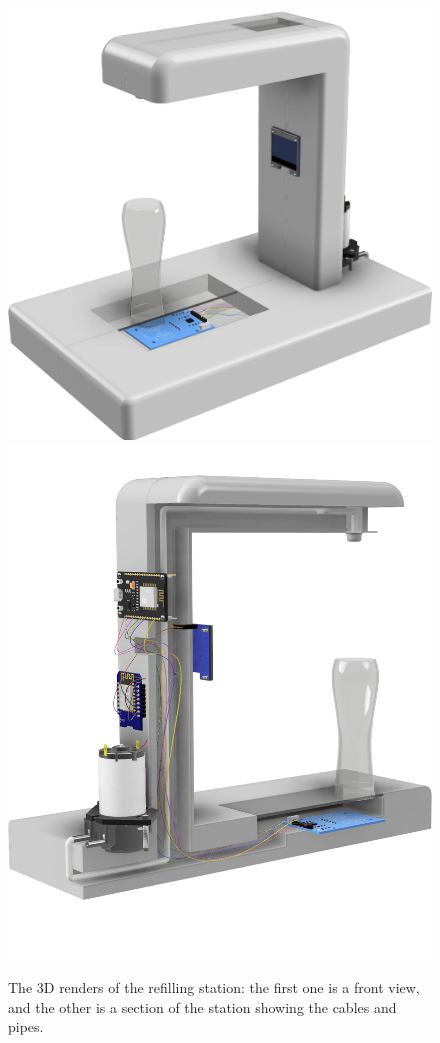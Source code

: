 \documentclass[target=bach,aauheader=,style=]{thud}
\begin{document}
\begin{figure}[h!]
	\centering
	\includegraphics[scale=0.23]{erogatorev13.png}
	\includegraphics[scale=0.29]{erogatorev12_wires.png}
	\caption{The 3D renders of the refilling station: the first one is a front view, and the other is a section of the station showing the cables and pipes.}
	\label{fig:3dmodelfront1}
\end{figure}
\end{document}
